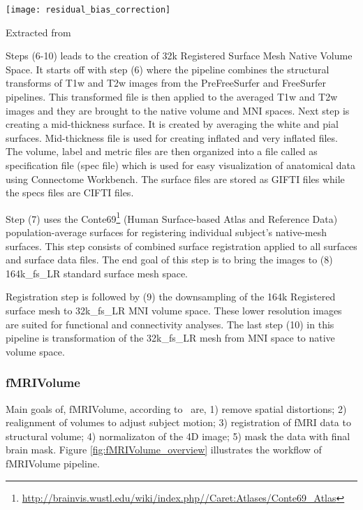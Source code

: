 \begin{center}
  \texttt{[image: residual\_bias\_correction]}
  \label{fig:residual_bias_correction}
  \caption*{Extracted from \cite{Gla13}}
\end{center}

Steps (6-10) leads to the creation of 32k Registered Surface Mesh Native Volume Space. It starts off with step (6) where the pipeline combines the structural transforms of T1w and T2w images from the PreFreeSurfer and FreeSurfer pipelines. This transformed file is then applied to the averaged T1w and T2w images and they are brought to the native volume and MNI spaces. Next step is creating a mid-thickness surface. It is created by averaging the white and pial surfaces. Mid-thickness file is used for creating inflated and very inflated files. The volume, label and metric files are then organized into a file called as specification file (spec file) which is used for easy visualization of anatomical data using Connectome Workbench. The surface files are stored as GIFTI files while the specs files are CIFTI files.

Step (7) uses the Conte69\footnote{\url{http://brainvis.wustl.edu/wiki/index.php//Caret:Atlases/Conte69\_Atlas}} (Human Surface-based Atlas and Reference Data) population-average surfaces for registering individual subject's native-mesh surfaces. This step consists of combined surface registration applied to all surfaces and surface data files. The end goal of this step is to bring the images to (8) 164k\_fs\_LR standard surface mesh space. 

Registration step is followed by (9) the downsampling of the 164k Registered surface mesh to 32k\_fs\_LR MNI volume space. These lower resolution images are suited for functional and connectivity analyses. The last step (10) in this pipeline is transformation of the 32k\_fs\_LR mesh from MNI space to native volume space. 




\subsubsection{fMRIVolume}
Main goals of, fMRIVolume, according to~\cite{Gla13} are, 1) remove spatial distortions; 2) realignment of volumes to adjust subject motion; 3) registration of fMRI data to structural volume; 4) normalizaton of the 4D image; 5) mask the data with final brain mask. Figure \ref{fig:fMRIVolume_overview} illustrates the workflow of fMRIVolume pipeline.

